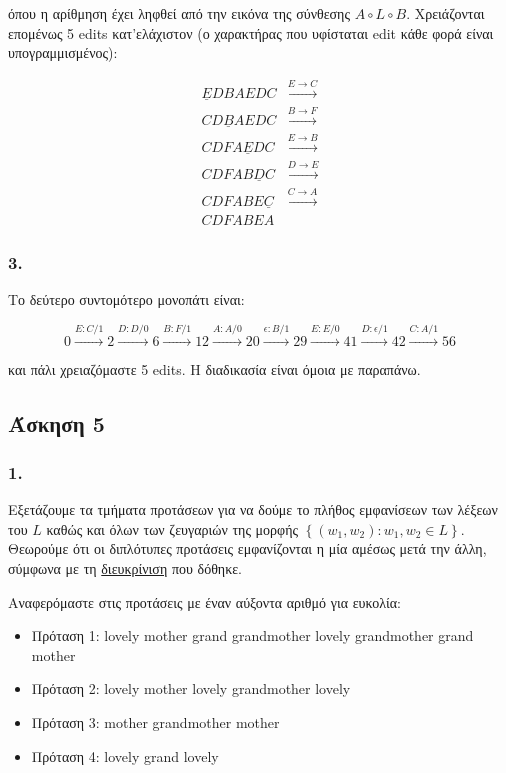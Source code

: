 \documentclass[12pt,a4paper]{article}
\begin{document}
			όπου η αρίθμηση έχει ληφθεί από την εικόνα της σύνθεσης $A \circ L \circ B$. Χρειάζονται επομένως 5 edits κατ'ελάχιστον (ο χαρακτήρας που υφίσταται edit κάθε φορά είναι υπογραμμισμένος):
			
			\begin{align*}
				\underline E D B A E D C &\xrightarrow{E \rightarrow C} \\
				C D \underline B A E D C &\xrightarrow{B \rightarrow F} \\
				C D F A \underline E D C &\xrightarrow{E \rightarrow B} \\
				C D F A B \underline D C &\xrightarrow{D \rightarrow E} \\
				C D F A B E \underline C &\xrightarrow{C \rightarrow A} \\
				C D F A B E A
			\end{align*}
		
		\subsubsection*{3.} 
			Το δεύτερο συντομότερο μονοπάτι είναι:
			
			\[
				0 \xrightarrow{E:C/1} 2 \xrightarrow{D:D/0} 6 \xrightarrow{B:F/1} 12 \xrightarrow{A:A/0} 20 \xrightarrow{\epsilon:B/1} 29 \xrightarrow{E:E/0} 41 \xrightarrow{D:\epsilon/1} 42 \xrightarrow{C:A/1} 56
			\]
			
			και πάλι χρειαζόμαστε 5 edits. Η διαδικασία είναι όμοια με παραπάνω.			

	\subsection*{Άσκηση 5}
		
		\subsubsection*{1.} 
			Εξετάζουμε τα τμήματα προτάσεων για να δούμε το πλήθος εμφανίσεων των λέξεων του $L$ καθώς και όλων των ζευγαριών της μορφής $\left\{(w_1, w_2) : w_1, w_2 \in L\right\}$. Θεωρούμε ότι οι διπλότυπες προτάσεις εμφανίζονται η μία αμέσως μετά την άλλη, σύμφωνα με τη \href{https://github.com/slp-ntua/slp-labs/issues/80}{διευκρίνιση} που δόθηκε. 
			
			Αναφερόμαστε στις προτάσεις με έναν αύξοντα αριθμό για ευκολία:
			
			\begin{itemize}
				\item Πρόταση 1: lovely mother grand grandmother lovely grandmother grand mother
				\item Πρόταση 2: lovely mother lovely grandmother lovely
				\item Πρόταση 3: mother grandmother mother
				\item Πρόταση 4: lovely grand lovely
			\end{itemize}
			
\end{document}
